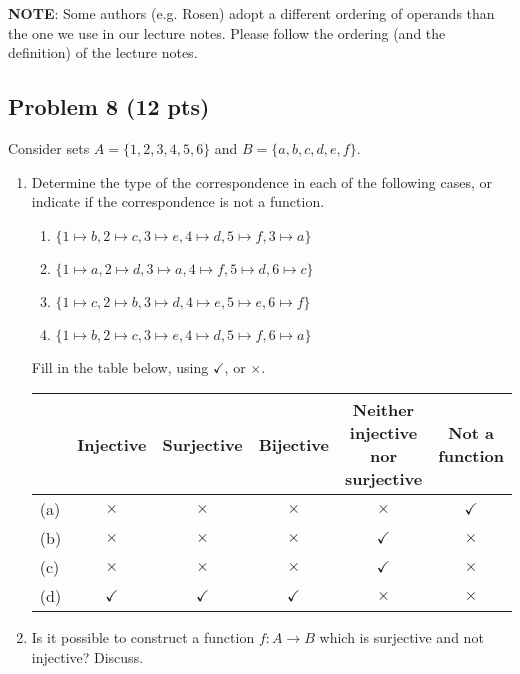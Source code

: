 \documentclass[12pt]{article}
\begin{document}
\noindent \textbf{NOTE}: Some authors (e.g. Rosen) adopt a different ordering of operands than the one we use in our lecture notes. Please follow the ordering (and the definition) of the lecture notes.

\newpage


\subsection{Problem 8 (12 pts)}

Consider sets $A = \{1, 2, 3, 4, 5, 6 \}$ and $B = \{ a, b, c, d, e, f \}$.

\begin{enumerate}

\item Determine the type of the correspondence in each of the following cases, or indicate if the correspondence is not a function.

\begin{enumerate}
\item $\{ 1 \mapsto b, 2 \mapsto c, 3 \mapsto e, 4 \mapsto d, 5 \mapsto f, 3 \mapsto a \}$

\item $\{ 1 \mapsto a, 2 \mapsto d, 3 \mapsto a, 4 \mapsto f, 5 \mapsto d, 6 \mapsto c \}$

\item $\{ 1 \mapsto c, 2 \mapsto b, 3 \mapsto d, 4 \mapsto e, 5 \mapsto e, 6 \mapsto f  \}$

\item $\{ 1 \mapsto b, 2 \mapsto c, 3 \mapsto e, 4 \mapsto d, 5 \mapsto f, 6 \mapsto a \}$
\end{enumerate}

\noindent Fill in the table below, using $\checkmark$, or $\times$.

\begin{center}
\begin{tabular}{|l|c|c|c|c|c|}
\hline
		& Injective		& Surjective	& Bijective 	& \multicolumn{1}{m{3cm}|}{Neither injective nor surjective}	&	Not a function	\\
\hline
(a)		&	$\times$	&	$\times$	&	$\times$	 &	$\times$	&	$\checkmark$  \\
\hline

(b)		&	$\times$	&	$\times$	&	$\times$	&	$\checkmark$	&	$\times$	 \\
\hline


(c)		&	$\times$	&	$\times$	&	$\times$	&	$\checkmark$	&	$\times$  \\
\hline

(d)		&	$\checkmark$	&	$\checkmark$	&	$\checkmark$	&	$\times$	&	$\times$  \\
\hline
\end{tabular}
\end{center}


\item Is it possible to construct a function $f : A \rightarrow B$ which is surjective and not injective?  Discuss.
\end{enumerate}
\end{document}
